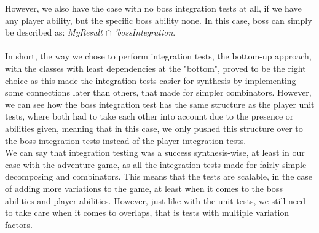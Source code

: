 However, we also have the case with no boss integration tests at all, if we have any player ability, but the specific boss ability none. In this case, boss can simply be described as: \textit{MyResult $\cap$ 'bossIntegration}. \\
\\
In short, the way we chose to perform integration tests, the bottom-up approach, with the classes with least dependencies at the "bottom", proved to be the right choice as this made the integration tests easier for synthesis by implementing some connections later than others, that made for simpler combinators. However, we can see how the boss integration test has the same structure as the player unit tests, where both had to take each other into account due to the presence or abilities given, meaning that in this case, we only pushed this structure over to the boss integration tests instead of the player integration tests. \\
We can say that integration testing was a success synthesis-wise, at least in our case with the adventure game, as all the integration tests made for fairly simple decomposing and combinators. This means that the tests are scalable, in the case of adding more variations to the game, at least when it comes to the boss abilities and player abilities. However, just like with the unit tests, we still need to take care when it comes to overlaps, that is tests with multiple variation factors.